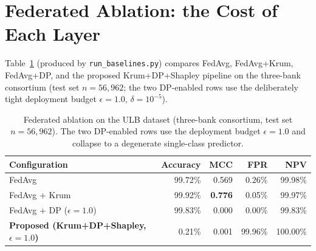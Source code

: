 \FloatBarrier

\section{Federated Ablation: the Cost of Each Layer}
\label{sec:fed-ablation}

Table~\ref{tab:fed_ablation} (produced by \texttt{run\_baselines.py}) compares FedAvg, FedAvg+Krum, FedAvg+DP, and the proposed Krum+DP+Shapley pipeline on the three-bank consortium (test set $n=56{,}962$; the two DP-enabled rows use the deliberately tight deployment budget $\epsilon=1.0$, $\delta=10^{-5}$).

\begin{table}[H]
\centering
\caption{Federated ablation on the ULB dataset (three-bank consortium, test set $n=56{,}962$). The two DP-enabled rows use the deployment budget $\epsilon=1.0$ and collapse to a degenerate single-class predictor.}
\label{tab:fed_ablation}
\begin{tabular}{|p{5.4cm}|r|r|r|r|}
\hline \textbf{Configuration} & \textbf{Accuracy} & \textbf{MCC} & \textbf{FPR} & \textbf{NPV} \\ \hline
FedAvg                         & 99.72\% & 0.569 & 0.26\%  & 99.98\% \\ \hline
FedAvg + Krum                  & 99.92\% & \textbf{0.776} & 0.05\%  & 99.97\% \\ \hline
FedAvg + DP ($\epsilon=1.0$)   & 99.83\% & 0.000 & 0.00\%  & 99.83\% \\ \hline
\textbf{Proposed (Krum+DP+Shapley, $\epsilon=1.0$)} & 0.21\% & 0.001 & 99.96\% & 100.00\% \\ \hline
\end{tabular}
\end{table}

